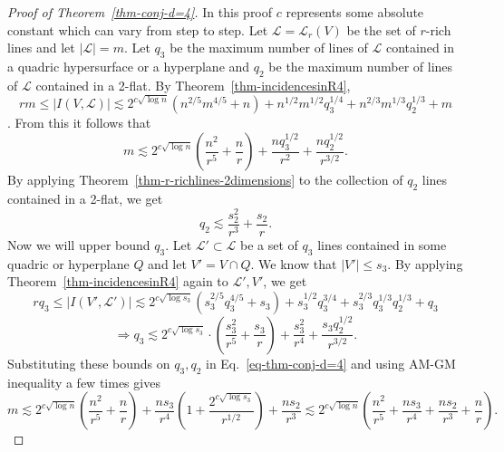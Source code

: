 \documentclass[11pt]{article}
\def\L{{\mathcal L}}
\begin{document}
\begin{appendix}
\begin{proof}[Proof of Theorem~\ref{thm-conj-d=4}]
In this proof $c$ represents some absolute constant which can vary from step to step. Let $\L=\L_r(V)$ be the set of $r$-rich lines and let $|\L|=m$. Let $q_3$ be the maximum number of lines of $\L$ contained in a quadric hypersurface or a hyperplane and $q_2$ be the maximum number of lines of $\L$ contained in a 2-flat. By Theorem~\ref{thm-incidencesinR4}, $$rm\le |I(V,\L)|\lesssim 2^{c\sqrt{\log n}}\left(n^{2/5}m^{4/5}+n\right)+n^{1/2}m^{1/2}q_3^{1/4}+n^{2/3}m^{1/3}q_2^{1/3}+m$$. From this it follows that
\begin{equation}
\label{eq-thm-conj-d=4}
 m\lesssim 2^{c\sqrt{\log n}}\left(\frac{n^2}{r^5}+\frac{n}{r}\right)+\frac{nq_3^{1/2}}{r^2}+\frac{nq_2^{1/2}}{r^{3/2}}.
\end{equation}
By applying Theorem~\ref{thm-r-richlines-2dimensions} to the collection of $q_2$ lines contained in a 2-flat, we get $$q_2\lesssim\frac{s_2^2}{r^{3}}+\frac{s_2}{r}.$$
Now we will upper bound $q_3$. Let $\L'\subset \L$ be a set of $q_3$ lines contained in some quadric or hyperplane $Q$ and let $V'=V\cap Q$. We know that $|V'|\le s_3$. By applying Theorem~\ref{thm-incidencesinR4} again to $\L',V'$, we get $$rq_3\le |I(V',\L')| \lesssim 2^{c\sqrt{\log s_3}}\left(s_3^{2/5}q_3^{4/5}+s_3\right)+s_3^{1/2}q_3^{3/4}+s_3^{2/3}q_3^{1/3}q_2^{1/3}+q_3$$
$$\Rightarrow q_3\lesssim 	2^{c\sqrt{\log s_3}}\cdot \left(\frac{s_3^2}{r^5}+\frac{s_3}{r}\right)+\frac{s_3^2}{r^4}+\frac{s_3q_2^{1/2}}{r^{3/2}}.$$
Substituting these bounds on $q_3,q_2$ in Eq.~\ref{eq-thm-conj-d=4} and using AM-GM inequality a few times gives $$m\lesssim2^{c\sqrt{\log n}}\left(\frac{n^2}{r^5}+\frac{n}{r}\right)+\frac{ns_3}{r^4}\left(1+\frac{2^{c\sqrt{\log s_3}}}{r^{1/2}}\right)+\frac{ns_2}{r^3} \lesssim 2^{c\sqrt{\log n}}\left(\frac{n^2}{r^5}+\frac{ns_3}{r^4}+\frac{ns_2}{r^3}+\frac{n}{r}\right).$$
\end{proof}





\end{appendix}
\end{document}
